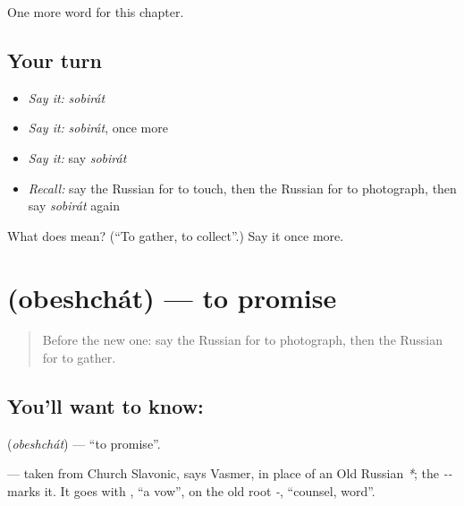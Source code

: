 \begin{grammarlens}[title={What you've built}]
One more word for this chapter.
\end{grammarlens}

\subsection*{Your turn}
\begin{itemize}
\raggedright
  \item \emph{Say it:} \emph{sobirát}
  \item \emph{Say it:} \emph{sobirát}, once more
  \item \emph{Say it:} say \emph{sobirát}
  \item \emph{Recall:} say the Russian for to touch, then the Russian for to photograph, then say \emph{sobirát} again
\end{itemize}

\begin{tcolorbox}[breakable,colback=teal!4,colframe=teal!35!black,title={Before you move on}]
What does  mean? (\textquotedblleft{}To gather, to collect\textquotedblright{}.) Say it once more.
\end{tcolorbox}
\section[\texorpdfstring{\ru{обещать} (obeshchát)}{обещать (obeshchát)}]{ (obeshchát) — to promise}

\label{lesson:RU-C209-obeshchat}



\begin{quote}
Before the new one: say the Russian for to photograph, then the Russian for to gather.
\end{quote}

\subsection*{You'll want to know: }
\textbf{} (\emph{obeshchát}) — \textquotedblleft{}to promise\textquotedblright{}.

\begin{cousinweb}
\textbf{} — taken from Church Slavonic, says Vasmer, in place of an Old Russian \emph{*}; the \emph{--} marks it. It goes with \emph{}, \textquotedblleft{}a vow\textquotedblright{}, on the old root \emph{-}, \textquotedblleft{}counsel, word\textquotedblright{}.
\end{cousinweb}

